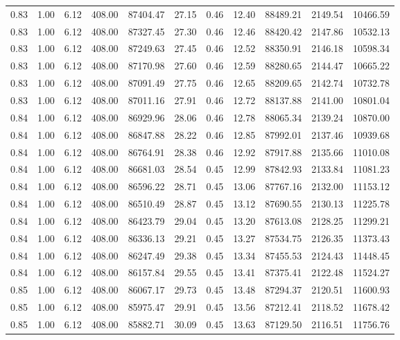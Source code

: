 \begin{table}[!ht]
\begin{tabular}{rrrrrrrrrrr}
0.83 & 1.00 & 6.12 & 408.00 & 87404.47 & 27.15 & 0.46 & 12.40 & 88489.21 & 2149.54 & 10466.59 \\
0.83 & 1.00 & 6.12 & 408.00 & 87327.45 & 27.30 & 0.46 & 12.46 & 88420.42 & 2147.86 & 10532.13 \\
0.83 & 1.00 & 6.12 & 408.00 & 87249.63 & 27.45 & 0.46 & 12.52 & 88350.91 & 2146.18 & 10598.34 \\
0.83 & 1.00 & 6.12 & 408.00 & 87170.98 & 27.60 & 0.46 & 12.59 & 88280.65 & 2144.47 & 10665.22 \\
0.83 & 1.00 & 6.12 & 408.00 & 87091.49 & 27.75 & 0.46 & 12.65 & 88209.65 & 2142.74 & 10732.78 \\
0.83 & 1.00 & 6.12 & 408.00 & 87011.16 & 27.91 & 0.46 & 12.72 & 88137.88 & 2141.00 & 10801.04 \\
0.84 & 1.00 & 6.12 & 408.00 & 86929.96 & 28.06 & 0.46 & 12.78 & 88065.34 & 2139.24 & 10870.00 \\
0.84 & 1.00 & 6.12 & 408.00 & 86847.88 & 28.22 & 0.46 & 12.85 & 87992.01 & 2137.46 & 10939.68 \\
0.84 & 1.00 & 6.12 & 408.00 & 86764.91 & 28.38 & 0.46 & 12.92 & 87917.88 & 2135.66 & 11010.08 \\
0.84 & 1.00 & 6.12 & 408.00 & 86681.03 & 28.54 & 0.45 & 12.99 & 87842.93 & 2133.84 & 11081.23 \\
0.84 & 1.00 & 6.12 & 408.00 & 86596.22 & 28.71 & 0.45 & 13.06 & 87767.16 & 2132.00 & 11153.12 \\
0.84 & 1.00 & 6.12 & 408.00 & 86510.49 & 28.87 & 0.45 & 13.12 & 87690.55 & 2130.13 & 11225.78 \\
0.84 & 1.00 & 6.12 & 408.00 & 86423.79 & 29.04 & 0.45 & 13.20 & 87613.08 & 2128.25 & 11299.21 \\
0.84 & 1.00 & 6.12 & 408.00 & 86336.13 & 29.21 & 0.45 & 13.27 & 87534.75 & 2126.35 & 11373.43 \\
0.84 & 1.00 & 6.12 & 408.00 & 86247.49 & 29.38 & 0.45 & 13.34 & 87455.53 & 2124.43 & 11448.45 \\
0.84 & 1.00 & 6.12 & 408.00 & 86157.84 & 29.55 & 0.45 & 13.41 & 87375.41 & 2122.48 & 11524.27 \\
0.85 & 1.00 & 6.12 & 408.00 & 86067.17 & 29.73 & 0.45 & 13.48 & 87294.37 & 2120.51 & 11600.93 \\
0.85 & 1.00 & 6.12 & 408.00 & 85975.47 & 29.91 & 0.45 & 13.56 & 87212.41 & 2118.52 & 11678.42 \\
0.85 & 1.00 & 6.12 & 408.00 & 85882.71 & 30.09 & 0.45 & 13.63 & 87129.50 & 2116.51 & 11756.76 \\

\end{tabular}
\end{table}
